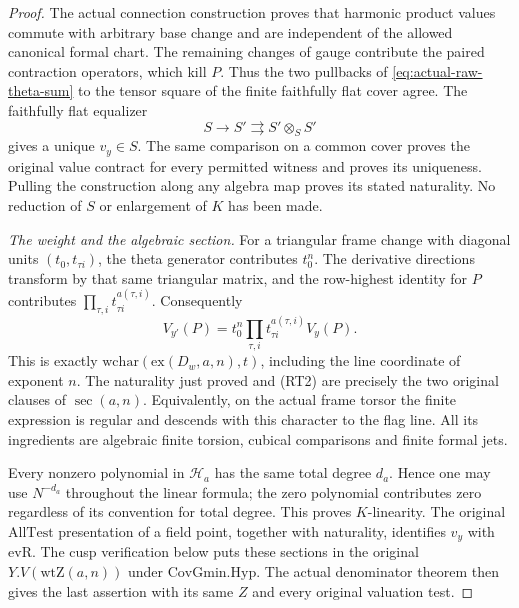 \begin{proof}
The actual connection construction proves that harmonic product
values commute with arbitrary base change and are independent
of the allowed canonical formal chart.  The remaining changes of
gauge contribute the paired contraction operators, which kill
$P$.  Thus the two pullbacks of
\eqref{eq:actual-raw-theta-sum} to the tensor square of the finite
faithfully flat cover agree.  The faithfully flat equalizer
\[
                   S\longrightarrow S'
                         \rightrightarrows S'\otimes_S S'
\]
gives a unique $v_y\in S$.  The same comparison on a common
cover proves the original value contract for every permitted
witness and proves its uniqueness.  Pulling the construction
along any algebra map proves its stated naturality.
No reduction of $S$ or enlargement of $K$ has been made.

\emph{The weight and the algebraic section.}
For a triangular frame change with diagonal units
$(t_0,t_{\tau i})$, the theta generator contributes $t_0^n$.
The derivative directions transform by that same triangular
matrix, and the row-highest identity for $P$ contributes
$\prod_{\tau,i}t_{\tau i}^{a(\tau,i)}$.  Consequently
\[
 V_{y'}(P)=t_0^n\prod_{\tau,i}t_{\tau i}^{a(\tau,i)}V_y(P).
                                                        \tag{RT2}
\]
This is exactly $\mathrm{wchar}(\mathrm{ex}(D_w,a,n),t)$,
including the line coordinate of exponent $n$.
The naturality just proved and \textup{(RT2)} are precisely the
two original clauses of $\operatorname{sec}(a,n)$.
Equivalently, on the actual frame torsor the finite expression is
regular and descends with this character to the flag line.
All its ingredients are algebraic finite torsion, cubical
comparisons and finite formal jets.

Every nonzero polynomial in $\mathcal H_a$ has the same total
degree $d_a$.  Hence one may use $N^{-d_a}$ throughout the
linear formula; the zero polynomial contributes zero regardless
of its convention for total degree.  This proves $K$-linearity.
The original $\mathrm{AllTest}$ presentation of a field point,
together with naturality, identifies $v_y$ with $\mathrm{evR}$.
The cusp verification below puts these sections in the original
$Y.V(\mathrm{wtZ}(a,n))$ under $\mathrm{CovGmin.Hyp}$.
The actual denominator theorem then gives the last assertion with
its same $Z$ and every original valuation test.
\end{proof}

